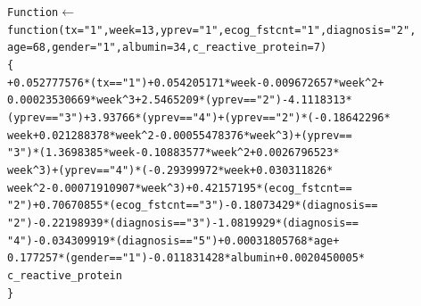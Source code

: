 \begin{alltt}
Function \(\leftarrow\) function (tx = "1", week = 13, yprev = "1", ecog_fstcnt = "1", diagnosis = "2", 
    age = 68, gender = "1", albumin = 34, c_reactive_protein = 7) 
\{
    +0.052777576 * (tx == "1") + 0.054205171 * week - 0.009672657 * week^2 + 
        0.00023530669 * week^3 + 2.5465209 * (yprev == "2") - 4.1118313 * 
        (yprev == "3") + 3.93766 * (yprev == "4") + (yprev == "2") * (-0.18642296 * 
        week + 0.021288378 * week^2 - 0.00055478376 * week^3) + (yprev == 
        "3") * (1.3698385 * week - 0.10883577 * week^2 + 0.0026796523 * 
        week^3) + (yprev == "4") * (-0.29399972 * week + 0.030311826 * 
        week^2 - 0.00071910907 * week^3) + 0.42157195 * (ecog_fstcnt == 
        "2") + 0.70670855 * (ecog_fstcnt == "3") - 0.18073429 * (diagnosis == 
        "2") - 0.22198939 * (diagnosis == "3") - 1.0819929 * (diagnosis == 
        "4") - 0.034309919 * (diagnosis == "5") + 0.00031805768 * age + 
        0.177257 * (gender == "1") - 0.011831428 * albumin + 0.0020450005 * 
        c_reactive_protein
\}
\end{alltt}
